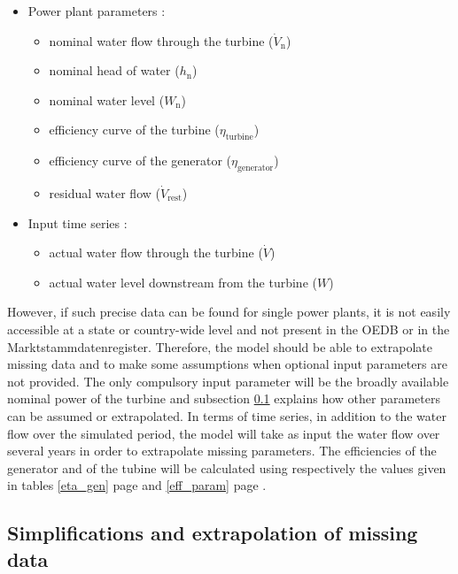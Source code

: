 \begin{itemize}
\itemsep0em
 \item Power plant parameters : 
 \begin{itemize}
  \item nominal water flow through the turbine ($\dot{V}_\mathrm{n}$)
  \item nominal head of water ($h_\mathrm{n}$)
  \item nominal water level ($W_\mathrm{n}$)
  \item efficiency curve of the turbine ($\eta_\mathrm{turbine}$) 
  \item efficiency curve of the generator ($\eta_\mathrm{generator}$)  
  \item residual water flow ($\dot{V}_\mathrm{rest}$)  
 \end{itemize}
 \item Input time series : 
 \begin{itemize}
  \item actual water flow through the turbine ($\dot{V}$)
  \item actual water level downstream from the turbine ($W$)
 \end{itemize}
\end{itemize}

However, if such precise data can be found for single power plants, it is not easily accessible at a state or country-wide level and not present in the OEDB or in the Marktstammdatenregister. 
Therefore, the model should be able to extrapolate missing data and to make some assumptions when optional input parameters are not provided. The only compulsory input parameter will be the broadly available nominal power of the turbine and subsection \ref{sub:assumptions} explains how other parameters can be assumed or extrapolated. \newline
In terms of time series, in addition to the water flow over the simulated period, the model will take as input the water flow over several years in order to extrapolate missing parameters.
The efficiencies of the generator and of the tubine will be calculated using respectively the values given in tables \ref{eta_gen} page \pageref{eta_gen} and \ref{eff_param} page \pageref{eff_param}.

\subsection{Simplifications and extrapolation of missing data}
\label{sub:assumptions}

